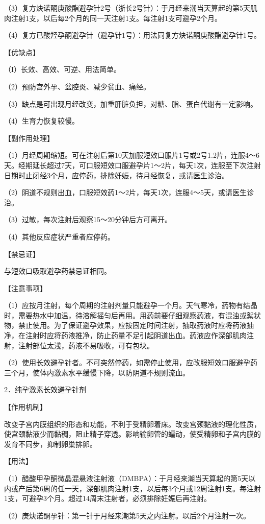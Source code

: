 \documentclass[12pt,UTF8,openany]{ctexbook}
\begin{document}
（3）复方炔诺酮庚酸酯避孕针2号（浙长2号针）：于月经来潮当天算起的第5天肌肉注射1支，以后每2个月的同一天注射1支。每注射1支可避孕2个月。

（4）复方已酸羟孕酮避孕针（避孕针1号）：用法同复方炔诺酮庚酸酯避孕针1号。

【优缺点】

（I）长效、高效、可逆、用法简单。

（2）预防宫外孕、盆腔炎、减少贫血、痛经。

（3）缺点是可出现月经改变，加重肝脏负担，对糖、脂、蛋白代谢有一定影响。

（4）生育力恢复较慢。

【副作用处理】

（1）月经周期缩短。可在注射后第10天加服短效口服片1号或2号1.2片，连服4～6天。经期延长超过7天，可口服短效口服避孕片1～2片，每天1次，连服至下次注射日期时止闭经3个月，应停药，排除妊娠，待月经恢复，或请医生诊治。

（2）阴道不规则出血，口服短效药1～2片，每天1次，连服4～5天，或请医生诊治。

（3）过敏，每次注射后观察15～20分钟后方可离开。

（4）其他反应症状严重者应停药。

【禁忌证】

与短效口吸取避孕药禁忌证相同。

【注意事项】

（1）应按月注射，每个周期的注射剂量只能避孕一个月。天气寒冷，药物有结晶时，需要热水中加温，待溶解摇匀后再用。用药前要仔细观察药液，有混浊或絮状物，禁止使用。为了保证避孕效果，应按固定时间注射，抽取药液时应将药液抽净，在注射时应将药液推净，防止药量不足引起阴道出血。药液应作深部肌肉注射，注射部位太浅，药液不易吸收，可有包块。

（2）使用长效避孕针者。不可突然停药，如需停止使用，应改服短效口服避孕药三个月，使体内激素水平缓慢下降，以防阴道不规则流血。

2．纯孕激素长效避孕针剂

【作用机制】

改变子宫内膜组织的形态和功能，不利于受精卵着床。改变宫颈黏液的理化性质，使宫颈黏液少而黏稠，阻止精子穿透。影响输卵管的蠕动，使受精卵和子宫内膜的发育不同步，抑制卵巢排卵。

【用法】

（1）醋酸甲孕酮微晶混悬液注射液（DMBPA）：于月经来潮当天算起的第5天以内或产后第6周的任一天，深部肌肉注射1支，以后每3个月或12周注射1支。每注射1支，可避孕3个月。超过14周末注射者，必须排除妊娠后再注射。

（2）庚炔诺酮孕针：第一针于月经来潮第5天之内注射。以后2个月注射一次。
\end{document}
